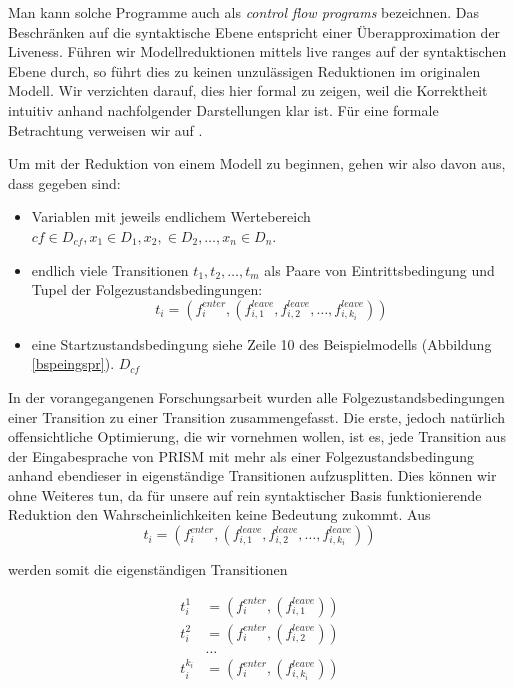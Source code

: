 \documentclass[a4paper]{article}
\theoremstyle{nonumberplain}
\begin{document}
Man kann solche Programme auch als \textit{control flow programs} bezeichnen.
Das Beschränken auf die syntaktische Ebene entspricht einer Überapproximation der Liveness.
Führen wir Modellreduktionen mittels live ranges auf der syntaktischen Ebene durch, so führt dies zu keinen unzulässigen Reduktionen im originalen Modell.
Wir verzichten darauf, dies hier formal zu zeigen, weil die Korrektheit intuitiv anhand nachfolgender Darstellungen klar ist. Für eine formale Betrachtung verweisen wir auf \cite{ThesisDubs}.


Um mit der Reduktion von einem Modell zu beginnen, gehen wir also davon aus, dass gegeben sind:
\begin{itemize}
	\item Variablen mit jeweils endlichem Wertebereich $cf \in D_{cf}, x_1 \in D_{1}, x_2, \in D_2, \dots, x_n \in D_n$.
	\item endlich viele Transitionen $t_1, t_2, \dots , t_m$ als Paare von Eintrittsbedingung und Tupel der Folgezustandsbedingungen:
	\[t_i = (f^{enter}_i, (f^{leave}_{i,1}, f^{leave}_{i,2}, \dots , f^{leave}_{i,k_i}))\]
	\item eine Startzustandsbedingung siehe Zeile 10 des Beispielmodells (Abbildung \ref{bspeingspr}). $D_{cf}$
\end{itemize}

In der vorangegangenen Forschungsarbeit \cite{dubslaff2019breaking} wurden alle Folgezustandsbedingungen einer Transition zu einer Transition zusammengefasst.
Die erste, jedoch natürlich offensichtliche Optimierung, die wir vornehmen wollen, ist es, jede Transition aus der Eingabesprache von PRISM mit mehr als einer Folgezustandsbedingung anhand ebendieser in eigenständige Transitionen aufzusplitten. Dies können wir ohne Weiteres tun, da für unsere auf rein syntaktischer Basis funktionierende Reduktion den Wahrscheinlichkeiten keine Bedeutung zukommt.
Aus 
\begin{equation*}
t_i = (f^{enter}_i, (f^{leave}_{i,1}, f^{leave}_{i,2}, \dots , f^{leave}_{i,k_i}))
\end{equation*}

werden somit die eigenständigen Transitionen

\begin{align*}
t_i^1 & = (f^{enter}_i, (f^{leave}_{i,1})) \\
t_i^2 & = (f^{enter}_i, (f^{leave}_{i,2})) \\
& \dots \\
t_i^{k_i} &= (f^{enter}_i, (f^{leave}_{i,k_i}))
\end{align*}
\end{document}

